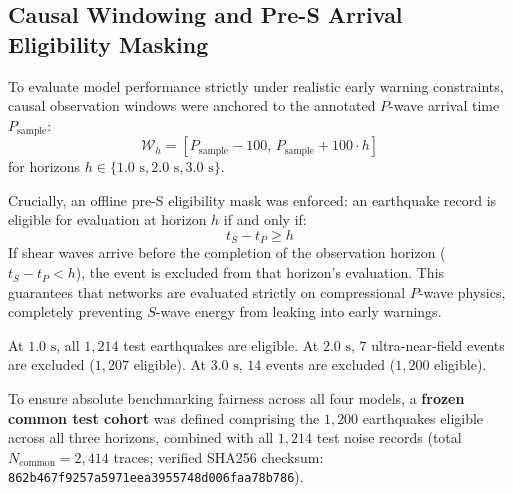\documentclass[journal]{IEEEtran}
\begin{document}
\subsection{Causal Windowing and Pre-S Arrival Eligibility Masking}
To evaluate model performance strictly under realistic early warning constraints, causal observation windows were anchored to the annotated $P$-wave arrival time $P_{\text{sample}}$:
\begin{equation}
\mathcal{W}_h = [P_{\text{sample}} - 100, \, P_{\text{sample}} + 100 \cdot h]
\label{eq:causal_window}
\end{equation}
for horizons $h \in \{1.0\text{ s}, 2.0\text{ s}, 3.0\text{ s}\}$.

Crucially, an offline pre-S eligibility mask was enforced: an earthquake record is eligible for evaluation at horizon $h$ if and only if:
\begin{equation}
t_S - t_P \ge h
\label{eq:pre_s_eligibility}
\end{equation}
If shear waves arrive before the completion of the observation horizon ($t_S - t_P < h$), the event is excluded from that horizon's evaluation. This guarantees that networks are evaluated strictly on compressional $P$-wave physics, completely preventing $S$-wave energy from leaking into early warnings.

At $1.0\text{ s}$, all $1,214$ test earthquakes are eligible. At $2.0\text{ s}$, $7$ ultra-near-field events are excluded ($1,207$ eligible). At $3.0\text{ s}$, $14$ events are excluded ($1,200$ eligible). 

To ensure absolute benchmarking fairness across all four models, a \textbf{frozen common test cohort} was defined comprising the $1,200$ earthquakes eligible across all three horizons, combined with all $1,214$ test noise records (total $N_{\text{common}} = 2,414$ traces; verified SHA256 checksum: {\footnotesize \texttt{862b467f\allowbreak 9257a597\allowbreak 1eea3955\allowbreak 748d006f\allowbreak aa78b786}}).
\end{document}
